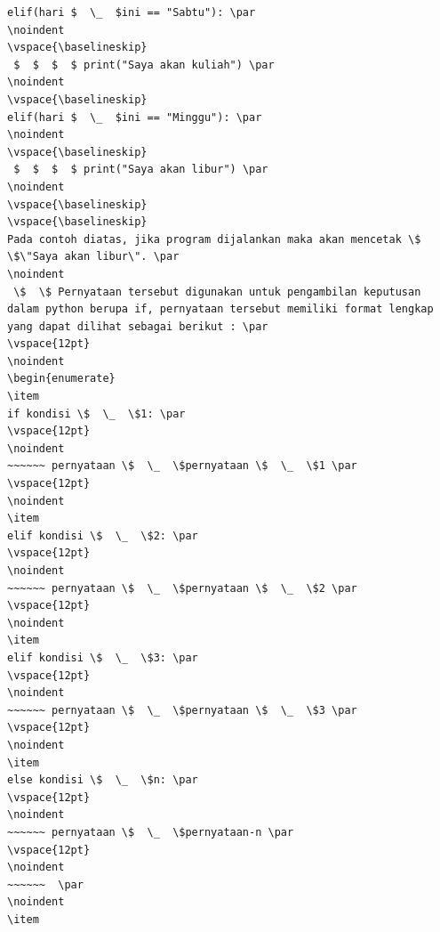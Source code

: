 \begin{verbatim}
elif(hari $  \_  $ini == "Sabtu"): \par
\noindent 
\vspace{\baselineskip}
 $  $  $  $ print("Saya akan kuliah") \par
\noindent 
\vspace{\baselineskip}
elif(hari $  \_  $ini == "Minggu"): \par
\noindent 
\vspace{\baselineskip}
 $  $  $  $ print("Saya akan libur") \par
\noindent 
\vspace{\baselineskip}
\vspace{\baselineskip}
Pada contoh diatas, jika program dijalankan maka akan mencetak \$  
\$\"Saya akan libur\". \par
\noindent 
 \$  \$ Pernyataan tersebut digunakan untuk pengambilan keputusan dalam python berupa if, pernyataan tersebut memiliki format lengkap  yang dapat dilihat sebagai berikut : \par
\vspace{12pt}
\noindent 
\begin{enumerate}
\item
if kondisi \$  \_  \$1: \par
\vspace{12pt}
\noindent 
~~~~~~ pernyataan \$  \_  \$pernyataan \$  \_  \$1 \par
\vspace{12pt}
\noindent 
\item
elif kondisi \$  \_  \$2: \par
\vspace{12pt}
\noindent 
~~~~~~ pernyataan \$  \_  \$pernyataan \$  \_  \$2 \par
\vspace{12pt}
\noindent 
\item
elif kondisi \$  \_  \$3: \par
\vspace{12pt}
\noindent 
~~~~~~ pernyataan \$  \_  \$pernyataan \$  \_  \$3 \par
\vspace{12pt}
\noindent 
\item
else kondisi \$  \_  \$n: \par
\vspace{12pt}
\noindent 
~~~~~~ pernyataan \$  \_  \$pernyataan-n \par
\vspace{12pt}
\noindent 
~~~~~~  \par
\noindent 
\item

\end{verbatim}
